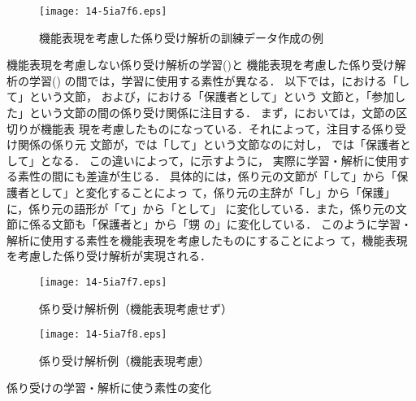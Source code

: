 \documentclass[japanese]{jnlp_1.3e}
\begin{document}
\begin{figure}[t]
\begin{center}
\texttt{[image: 14-5ia7f6.eps]}
\end{center}
 \caption{機能表現を考慮した係り受け解析の訓練データ作成の例}
 \label{fig:訓練データ作成の流れ}
\end{figure}

機能表現を考慮しない係り受け解析の学習()と
機能表現を考慮した係り受け解析の学習()
の間では，学習に使用する素性が異なる．
以下では，における「して」という文節，
および，における「保護者として」という
文節と，「参加した」という文節の間の係り受け関係に注目する．
まず，においては，文節の区切りが機能表
現を考慮したものになっている．それによって，注目する係り受け関係の係り元
文節が，では「して」という文節なのに対し，
では「保護者として」となる．
この違いによって，に示すように，
実際に学習・解析に使用する素性の間にも差違が生じる．
具体的には，係り元の文節が「して」から「保護者として」と変化することによっ
て，係り元の主辞が「し」から「保護」に，係り元の語形が「て」から「として」
に変化している．また，係り元の文節に係る文節も「保護者と」から「甥
の」に変化している．
このように学習・解析に使用する素性を機能表現を考慮したものにすることによっ
て，機能表現を考慮した係り受け解析が実現される．


\begin{figure}[t]
\begin{center}
\texttt{[image: 14-5ia7f7.eps]}
\end{center}
 \caption{係り受け解析例（機能表現考慮せず）}
 \label{fig:feature_for_cabocha1}
\end{figure}
\begin{figure}[t]
\begin{center}
\texttt{[image: 14-5ia7f8.eps]}
\end{center}
 \caption{係り受け解析例（機能表現考慮）}
 \label{fig:feature_for_cabocha2}
\end{figure}



\begin{table}[t]
  \caption{係り受けの学習・解析に使う素性の変化}
  \label{tbl:feature_change_for_cabocha}

\end{table}
\end{document}
